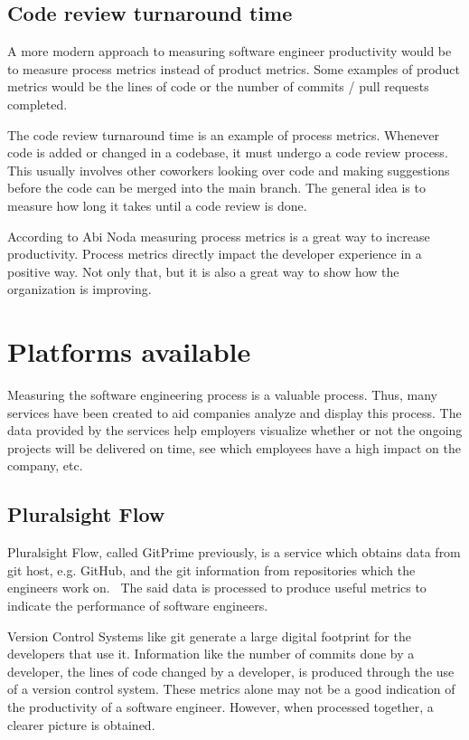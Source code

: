 \documentclass{article}
\begin{document}
\subsection{Code review turnaround time}
A more modern approach to measuring software engineer productivity would be to
measure process metrics instead of product metrics. Some examples of product
metrics would be the lines of code or the number of commits / pull requests
completed.

The code review turnaround time is an example of process metrics. Whenever code
is added or changed in a codebase, it must undergo a code review process. This
usually involves other coworkers looking over code and making suggestions
before the code can be merged into the main branch. The general idea is to
measure how long it takes until a code review is done.

According to Abi Noda measuring process metrics is a great way to increase
productivity. Process metrics directly impact the developer experience in a
positive way. Not only that, but it is also a great way to show how the
organization is improving.~\cite{elusive2019quest}

\section{Platforms available}
Measuring the software engineering process is a valuable process. Thus, many
services have been created to aid companies analyze and display this process.
The data provided by the services help employers visualize whether or not the
ongoing projects will be delivered on time, see which employees have a high
impact on the company, etc.

\subsection{Pluralsight Flow}
Pluralsight Flow, called GitPrime previously, is a service which obtains data
from git host, e.g. GitHub, and the git information from repositories which the
engineers work on.~\cite{plural2019sight} The said data is processed to produce
useful metrics to indicate the performance of software engineers.

Version Control Systems like git generate a large digital footprint for the
developers that use it. Information like the number of commits done by a
developer, the lines of code changed by a developer, is produced through the
use of a version control system. These metrics alone may not be a good
indication of the productivity of a software engineer. However, when processed
together, a clearer picture is obtained.
\end{document}
